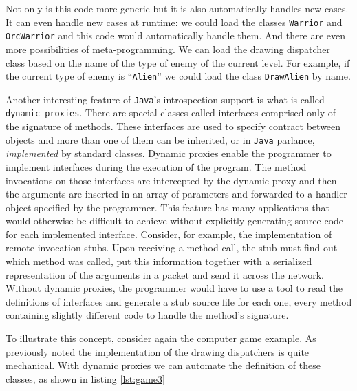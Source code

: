 Not only is this code more generic but it is also automatically handles new cases. It can even handle new cases at runtime: we could load
the classes \texttt{Warrior} and \texttt{OrcWarrior} and this code would automatically handle them. And there are even more possibilities
of meta-programming. We can load the drawing dispatcher class based on the name of the type of enemy of the current level. For example,
if the current type of enemy is ``\texttt{Alien}'' we could load the class \texttt{DrawAlien} by name.


Another interesting feature of \texttt{Java}'s introspection support is what is called \texttt{dynamic proxies}. There are special classes
called interfaces comprised only of the signature of methods. These interfaces are used to specify contract between objects
and more than one of them can be inherited, or in \texttt{Java} parlance, \emph{implemented} by standard classes. Dynamic proxies enable
the programmer to implement interfaces during the execution of the program. The method invocations on those interfaces are intercepted
by the dynamic proxy and then the arguments are inserted in an array of parameters and forwarded to a handler object specified
by the programmer. This feature has many applications that would otherwise be difficult to achieve without explicitly generating
source code for each implemented interface. Consider, for example, the implementation of remote invocation stubs. Upon receiving
a method call, the stub must find out which method was called, put this information together with a serialized representation
of the arguments in a packet and send it across the network. Without dynamic proxies, the programmer would have to use
a tool to read the definitions of interfaces and generate a stub source file for each one, every method containing slightly
different code to handle the method's signature.

To illustrate this concept, consider again the computer game example. As previously noted the implementation of the drawing dispatchers
is quite mechanical. With dynamic proxies we can automate the definition of these classes, as shown in listing \ref{lst:game3}

